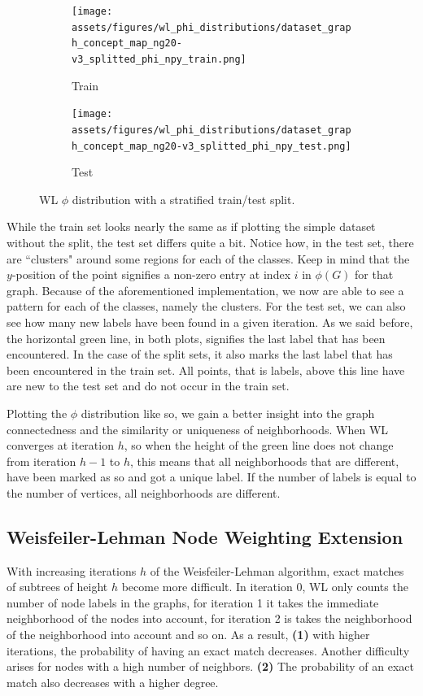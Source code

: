 \begin{figure}[htb!]
	\begin{subfigure}[t]{.49\linewidth}%
		{\texttt{[image: assets/figures/wl\_phi\_distributions/dataset\_graph\_concept\_map\_ng20-v3\_splitted\_phi\_npy\_train.png]}}\caption{Train}%
	\end{subfigure}%
	\begin{subfigure}[t]{.49\linewidth}%
		{\texttt{[image: assets/figures/wl\_phi\_distributions/dataset\_graph\_concept\_map\_ng20-v3\_splitted\_phi\_npy\_test.png]}}\caption{Test}%
	\end{subfigure}%
	\caption[Diagram: $\phi$ distribution plot for \textit{ng20}.]{WL $\phi$ distribution with a stratified train/test split.}%
	\label{fig:phi_distribution_train_test}
\end{figure}

While the train set looks nearly the same as if plotting the simple dataset without the split, the test set differs quite a bit.
Notice how, in the test set, there are ``clusters" around some regions for each of the classes. 
Keep in mind that the $y$-position of the point signifies a non-zero entry at index $i$ in $\phi(G)$ for that graph.
Because of the aforementioned implementation, we now are able to see a pattern for each of the classes, namely the clusters.
For the test set, we can also see how many new labels have been found in a given iteration.
As we said before, the horizontal green line, in both plots, signifies the last label that has been encountered.
In the case of the split sets, it also marks the last label that has been encountered in the train set.
All points, that is labels, above this line have are new to the test set and do not occur in the train set.

Plotting the $\phi$ distribution like so, we gain a better insight into the graph connectedness and the similarity or uniqueness of neighborhoods.
When WL converges at iteration $h$, so when the height of the green line does not change from iteration $h-1$ to $h$, this means that all neighborhoods that are different, have been marked as so and got a unique label.
If the number of labels is equal to the number of vertices, all neighborhoods are different.

\subsection{Weisfeiler-Lehman Node Weighting Extension}
With increasing iterations $h$ of the Weisfeiler-Lehman algorithm, exact matches of subtrees of height $h$ become more difficult.
In iteration 0, WL only counts the number of node labels in the graphs, for iteration 1 it takes the immediate neighborhood of the nodes into account, for iteration 2 is takes the neighborhood of the neighborhood into account and so on.
As a result, \textbf{(1)} with higher iterations, the probability of having an exact match decreases. Another difficulty arises for nodes with a high number of neighbors. \textbf{(2)} The probability of an exact match also decreases with a higher degree.

